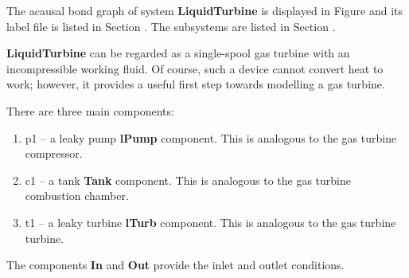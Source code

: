 

   The acausal bond graph of system \textbf{LiquidTurbine} is
   displayed in Figure  and its label
   file is listed in Section .
   The subsystems are listed in Section .

\textbf{LiquidTurbine} can be regarded as a single-spool gas turbine
with an incompressible working fluid. Of course, such a device cannot
convert heat to work; however, it provides a useful first step towards
modelling a gas turbine.

There are three main components:
\begin{enumerate}
\item p1 -- a leaky pump \textbf{lPump} component. This is analogous
  to the gas turbine compressor.
\item c1 -- a tank \textbf{Tank} component. This is analogous
  to the gas turbine combustion chamber.
\item t1 -- a leaky turbine \textbf{lTurb} component. This is analogous
  to the gas turbine turbine.
\end{enumerate}
The components \textbf{In} and \textbf{Out} provide the inlet and
outlet conditions.

